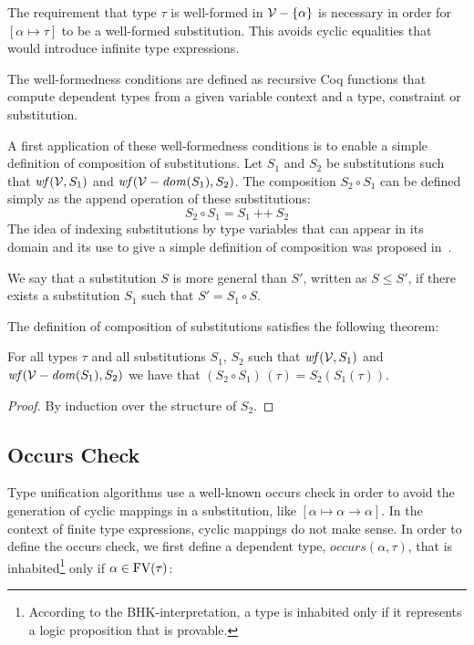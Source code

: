 The requirement that type $\tau$ is well-formed in $\mathcal{V} - \{\alpha\}$
is necessary in order for $[\alpha\mapsto \tau]$ to be a well-formed
substitution. This avoids cyclic equalities that would introduce
infinite type expressions.

The well-formedness conditions are defined as recursive Coq functions
that compute dependent types from a given variable context and a type,
constraint or substitution.

A first application of these well-formedness conditions is to enable a
simple definition of composition of substitutions.  Let $S_1$ and
$S_2$ be substitutions such that $\text{\it wf\/}(\mathcal{V},S_1)$ and
$\text{\it wf\/}(\mathcal{V}-\text{\it dom\/}(S_1),S_2)$. The composition $S_2 \circ S_1$ can be
defined simply as the append operation of these substitutions:
\[ S_2 \circ S_1 = S_1\: \texttt{++}\: S_2 \]
The idea of indexing substitutions by type variables that can appear
in its domain and its use to give a simple definition of composition
was proposed in~. 

We say that a substitution $S$ is more general than $S'$, written as
$S\leq S'$, if there exists a substitution $S_1$ such that $S' = S_1
\circ S$.  

The definition of composition of substitutions satisfies the following
theorem:

\begin{Theorem}
For all types $\tau$ and all substitutions $S_1$, $S_2$ such that
$\text{\it wf\/}(\mathcal{V},S_1)$ and $\text{\it wf\/}(\mathcal{V}-\text{\it dom\/}(S_1),S_2)$ we have that $(S_2 \circ
S_1)\,(\tau) = S_2 (S_1 (\tau))$.
\end{Theorem}
\begin{proof}
By induction over the structure of $S_2$.
\end{proof}

\subsection{Occurs Check}

\newcommand{\occurs}{\text{\it occurs\/}}

Type unification algorithms use a well-known occurs check in order to
avoid the generation of cyclic mappings in a substitution, like
$[\alpha\mapsto\alpha\to\alpha]$. In the context of finite type
expressions, cyclic mappings do not make sense. In order to define the
occurs check, we first define a dependent type, $occurs(\alpha,\tau)$,
that is inhabited\footnote{According to the BHK-interpretation, a type
  is inhabited only if it represents a logic proposition that is
  provable.} only if $\alpha\in\text{FV}(\tau)$:


